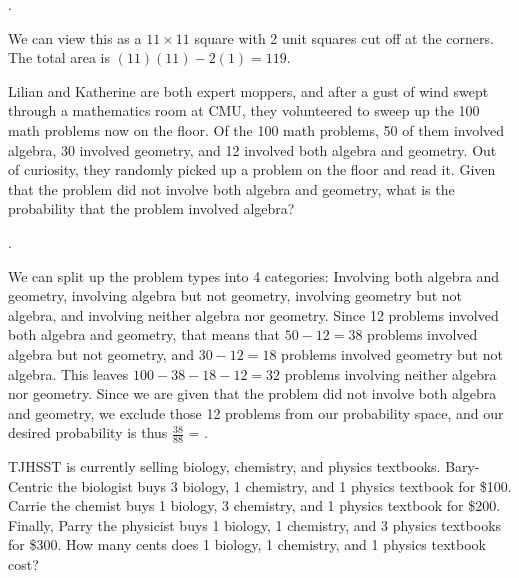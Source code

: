 \documentclass[11pt]{article}
\begin{document}
\begin{answer}
.
\end{answer}

\begin{solution}
We can view this as a $11\times11$ square with 2 unit squares cut off at the corners. The total area is $(11)(11)-2(1) = \boxed{119}$.
\end{solution}

\begin{problem}
Lilian and Katherine are both expert moppers, and after a gust of wind swept through a mathematics room at CMU, they volunteered to sweep up the 100 math problems now on the floor. Of the 100 math problems, 50 of them involved algebra, 30 involved geometry, and 12 involved both algebra and geometry. Out of curiosity, they randomly picked up a problem on the floor and read it. Given that the problem did not involve both algebra and geometry, what is the probability that the problem involved algebra?
\end{problem}

\begin{answer}
.
\end{answer}

\begin{solution}
We can split up the problem types into 4 categories: Involving both algebra and geometry, involving algebra but not geometry, involving geometry but not algebra, and involving neither algebra nor geometry. Since 12 problems involved both algebra and geometry, that means that $50-12 = 38$ problems involved algebra but not geometry, and $30-12 = 18$ problems involved geometry but not algebra. This leaves $100 - 38 - 18 - 12 = 32$ problems involving neither algebra nor geometry. Since we are given that the problem did not involve both algebra and geometry, we exclude those 12 problems from our probability space, and our desired probability is thus $\frac{38}{88}$ = .
\end{solution}

\begin{problem}
TJHSST is currently selling biology, chemistry, and physics textbooks. Bary-Centric the biologist buys 3 biology, 1 chemistry, and 1 physics textbook for \$100. Carrie the chemist buys 1 biology, 3 chemistry, and 1 physics textbook for \$200. Finally, Parry the physicist buys 1 biology, 1 chemistry, and 3 physics textbooks for \$300. How many cents does 1 biology, 1 chemistry, and 1 physics textbook cost?
\end{problem}
\end{document}
